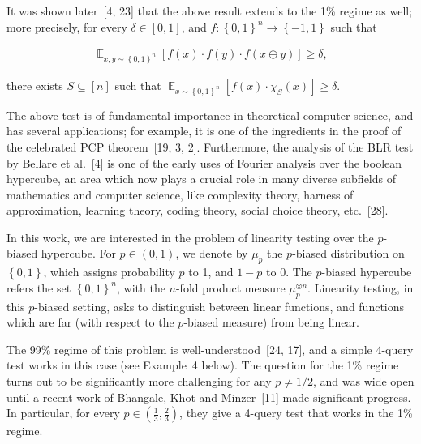 It was shown later [4, 23] that the above result extends to the 1\% regime as well; more precisely, for every $\delta\in[0,1]$, and $f:\left\{0,1\right\}^{n}\to\left\{-1,1\right\}$ such that\par


\[\begin{gathered}
\mathop{\mathbb{E}}_{x,y\sim\left\{0,1\right\}^{n}}\left[f(x)\cdot f(y)\cdot f(x\oplus y)\right]\geqslant\delta,
\end{gathered}\]


there exists $S\subseteq[n]$ such that $\mathop{\mathbb{E}}_{x\sim\left\{0,1\right\}^{n}}\left[f(x)\cdot\chi_{S}(x)\right]\geqslant\delta$.\par




The above test is of fundamental importance in theoretical computer science, and has several applications; for example, it is one of the ingredients in the proof of the celebrated PCP theorem [19, 3, 2].
Furthermore, the analysis of the BLR test by Bellare et al. [4] is one of the early uses of Fourier analysis over the boolean hypercube, an area which now plays a crucial role in many diverse subfields of mathematics and computer science, like complexity theory, harness of approximation, learning theory, coding theory, social choice theory, etc. [28].\par




In this work, we are interested in the problem of linearity testing over the $p$-biased hypercube.
For $p\in(0,1)$, we denote by $\mu_{p}$ the $p$-biased distribution on $\left\{0,1\right\}$, which assigns probability $p$ to 1, and $1-p$ to 0.
The $p$-biased hypercube refers the set $\left\{0,1\right\}^{n}$, with the $n$-fold product measure $\mu_{p}^{\otimes n}$.
Linearity testing, in this $p$-biased setting, asks to distinguish between linear functions, and functions which are far (with respect to the $p$-biased measure) from being linear.\par




The 99\% regime of this problem is well-understood [24, 17], and a simple 4-query test works in this case (see Example 4 below).
The question for the 1\% regime turns out to be significantly more challenging for any $p\not=1/2$, and was wide open until a recent work of Bhangale, Khot and Minzer [11] made significant progress.
In particular, for every $p\in\left(\frac{1}{3},\frac{2}{3}\right)$, they give a 4-query test that works in the 1\% regime.\par




